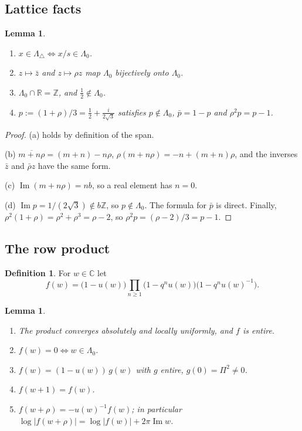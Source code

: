 \documentclass[11pt]{article}
\newtheorem{lemma}[theorem]{Lemma}
\theoremstyle{definition}
\newtheorem{definition}[theorem]{Definition}
\theoremstyle{remark}
\newcommand{\C}{\mathbb C}
\newcommand{\R}{\mathbb R}
\newcommand{\Z}{\mathbb Z}
\newcommand{\LamO}{\Lambda_0}
\newcommand{\Ltri}{\Lambda_{\triangle}}
\DeclareMathOperator{\Imag}{Im}
\begin{document}
\subsection{Lattice facts}

\begin{lemma}\label{lem:B1}
\begin{enumerate}
\item[(a)] $x\in\Ltri\iff x/s\in\LamO$.
\item[(b)] $z\mapsto\bar z$ and $z\mapsto\rho z$ map $\LamO$ bijectively onto $\LamO$.
\item[(c)] $\LamO\cap\R=\Z$, and $\tfrac12\notin\LamO$.
\item[(d)] $p:=(1+\rho)/3=\tfrac12+\tfrac{i}{2\sqrt3}$ satisfies $p\notin\LamO$, $\bar p=1-p$ and $\rho^2p=p-1$.
\end{enumerate}
\end{lemma}

\begin{proof}
(a) holds by definition of the span.

(b) $\overline{m+n\rho}=(m+n)-n\rho$, $\rho(m+n\rho)=-n+(m+n)\rho$, and the inverses $\bar z$ and $\bar\rho z$ have
the same form.

(c) $\Imag(m+n\rho)=nb$, so a real element has $n=0$.

(d) $\Imag p=1/(2\sqrt3)\notin b\Z$, so $p\notin\LamO$. The formula for $\bar p$ is direct. Finally,
$\rho^2(1+\rho)=\rho^2+\rho^3=\rho-2$, so $\rho^2p=(\rho-2)/3=p-1$.
\end{proof}

\subsection{The row product}

\begin{definition}\label{def:f}
For $w\in\C$ let
\[
 f(w)=\bigl(1-u(w)\bigr)\prod_{n\ge1}\bigl(1-q^nu(w)\bigr)\bigl(1-q^nu(w)^{-1}\bigr).
\]
\end{definition}

\begin{lemma}\label{lem:B2}
\begin{enumerate}
\item[(a)] The product converges absolutely and locally uniformly, and $f$ is entire.
\item[(b)] $f(w)=0\iff w\in\LamO$.
\item[(c)] $f(w)=(1-u(w))\,g(w)$ with $g$ entire, $g(0)=\Pi^2\neq0$.
\item[(d)] $f(w+1)=f(w)$.
\item[(e)] $f(w+\rho)=-u(w)^{-1}f(w)$; in particular $\log|f(w+\rho)|=\log|f(w)|+2\pi\Imag w$.
\end{enumerate}
\end{lemma}
\end{document}

